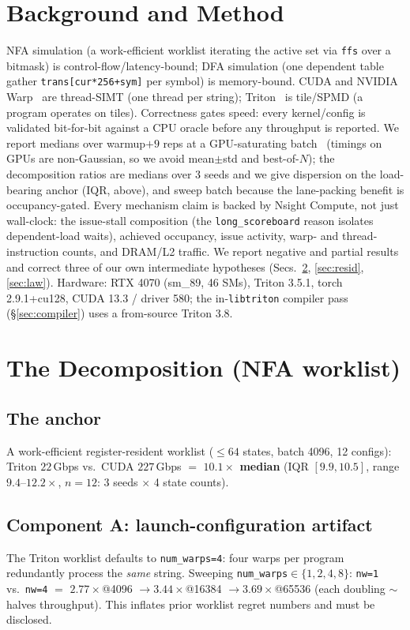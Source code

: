 \documentclass[acmsmall,review,anonymous]{acmart}
\begin{document}
\section{Background and Method}
NFA simulation (a work-efficient worklist iterating the active set via \texttt{ffs} over a bitmask) is
control-flow/latency-bound; DFA simulation (one dependent table gather \texttt{trans[cur*256+sym]} per
symbol) is memory-bound. CUDA and NVIDIA Warp~\cite{warp2022} are thread-SIMT (one thread per string);
Triton~\cite{triton2019} is tile/SPMD (a program operates on tiles). Correctness gates speed: every
kernel/config is validated bit-for-bit against a CPU oracle before any throughput is reported. We
report medians over warmup${+}9$ reps at a GPU-saturating batch~\cite{hoefler2015} (timings on GPUs
are non-Gaussian, so we avoid mean$\pm$std and best-of-$N$); the decomposition ratios are medians over 3
seeds and we give dispersion on the load-bearing anchor (IQR, above), and sweep batch because the lane-packing
benefit is occupancy-gated. Every mechanism claim is backed by Nsight Compute, not just wall-clock:
the issue-stall composition (the \texttt{long\_scoreboard} reason isolates dependent-load waits),
achieved occupancy, issue activity, warp- and thread-instruction counts, and DRAM/L2 traffic. We report negative and partial results and correct
three of our own intermediate hypotheses (Secs.~\ref{sec:decomp}, \ref{sec:resid}, \ref{sec:law}).
Hardware: RTX 4070 (sm\_89, 46 SMs), Triton 3.5.1, torch 2.9.1+cu128, CUDA 13.3 / driver 580; the
in-\texttt{libtriton} compiler pass (\S\ref{sec:compiler}) uses a from-source Triton 3.8.

\section{The Decomposition (NFA worklist)}\label{sec:decomp}

\subsection{The anchor}
A work-efficient register-resident worklist ($\le 64$ states, batch 4096, 12 configs): Triton
$22$\,Gbps vs.\ CUDA $227$\,Gbps $=$ \textbf{$10.1\times$ median} (IQR $[9.9, 10.5]$, range $9.4$--$12.2\times$, $n{=}12$: 3 seeds $\times$ 4 state counts).

\subsection{Component A: launch-configuration artifact}\label{sec:artifact}
The Triton worklist defaults to \texttt{num\_warps=4}: four warps per program redundantly process the
\emph{same} string. Sweeping \texttt{num\_warps}$\in\{1,2,4,8\}$: \texttt{nw=1} vs.\ \texttt{nw=4} $=$
$2.77\times$@4096 $\rightarrow 3.44\times$@16384 $\rightarrow 3.69\times$@65536 (each doubling
${\sim}$halves throughput). This inflates prior worklist regret numbers and must be disclosed.
\end{document}

